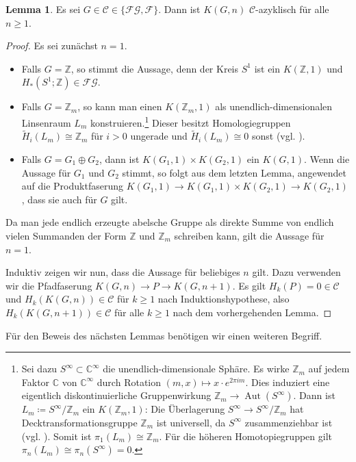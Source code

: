 \documentclass[11pt, a4paper, german]{article}
\theoremstyle{definition}
\newtheorem{lem}{Lemma}
\theoremstyle{remark}
\newcommand{\Z}{\mathbb{Z}} %
\newcommand{\C}{\mathbb{C}} %
\newcommand{\SC}{\mathcal{C}} %
\newcommand{\FG}{\mathcal{FG}} %
\newcommand{\F}{\mathcal{F}} %
\DeclareMathOperator{\Aut}{Aut} %
\begin{document}
\begin{lem}\label{homology-kgn-in-c}
  Es sei $G \in \SC \in \{ \FG, \F \}$.
  Dann ist $K(G, n)$ $\SC$-azyklisch für alle $n \geq 1$.
\end{lem}

\begin{proof}
  Es sei zunächst $n=1$.
  \begin{itemize}
    \item Falls $G = \Z$, so stimmt die Aussage, denn der Kreis $S^1$ ist ein $K(\Z, 1)$ und $H_*(S^1; \Z) \in \FG$.
    \item Falls $G = \Z_m$, so kann man einen $K(\Z_m, 1)$ als unendlich-dimensionalen Linsenraum $L_m$ konstruieren.\footnote{Sei dazu $S^\infty \subset \C^\infty$ die unendlich-dimensionale Sphäre. Es wirke $\Z_m$ auf jedem Faktor $\C$ von $\C^\infty$ durch Rotation $(m, x) \mapsto x \cdot e^{2 \pi i m}$. Dies induziert eine eigentlich diskontinuierliche Gruppenwirkung $\Z_m \to \Aut(S^\infty)$. Dann ist $L_m \coloneqq S^\infty / \Z_m$ ein $K(\Z_m, 1)$: Die Überlagerung $S^\infty \to S^\infty / \Z_m$ hat Decktransformationsgruppe $\Z_m$ ist universell, da $S^\infty$ zusammenziehbar ist (vgl. \cite[\mbox{}1B.3-1B.4]{hatcher:at}). Somit ist $\pi_1(L_m) \cong \Z_m$. Für die höheren Homotopiegruppen gilt $\pi_n(L_m) \cong \pi_n(S^\infty) = 0$.}
    Dieser besitzt Homologiegruppen $\tilde{H}_i(L_m) \cong \Z_m$ für $i > 0$ ungerade und $\tilde{H}_i(L_m) \cong 0$ sonst (vgl. \cite[\mbox{}2.43]{hatcher:at}).
    \item Falls $G = G_1 \oplus G_2$, dann ist $K(G_1, 1) \times K(G_2, 1)$ ein $K(G, 1)$.
    Wenn die Aussage für $G_1$ und $G_2$ stimmt, so folgt aus dem letzten Lemma, angewendet auf die Produktfaserung $K(G_1, 1) \to K(G_1, 1) \times K(G_2, 1) \to K(G_2, 1)$, dass sie auch für $G$ gilt.
  \end{itemize}
  Da man jede endlich erzeugte abelsche Gruppe als direkte Summe von endlich vielen Summanden der Form $\Z$ und $\Z_m$ schreiben kann, gilt die Aussage für $n=1$.

  Induktiv zeigen wir nun, dass die Aussage für beliebiges $n$ gilt.
  Dazu verwenden wir die Pfadfaserung $K(G, n) \to P \to K(G, n{+}1)$.
  Es gilt $H_k(P) = 0 \in \SC$ und $H_k(K(G, n)) \in \SC$ für $k \geq 1$ nach Induktionshypothese, also $H_k(K(G, n{+}1)) \in \SC$ für alle $k \geq 1$ nach dem vorhergehenden Lemma.
\end{proof}

Für den Beweis des nächsten Lemmas benötigen wir einen weiteren Begriff.
\end{document}

